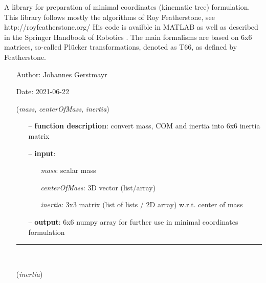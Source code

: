 \begin{itemize}[leftmargin=1.4cm]
\begin{itemize}[leftmargin=1.4cm]
\begin{itemize}[leftmargin=1.4cm]
\begin{itemize}[leftmargin=0.5cm]
\begin{itemize}[leftmargin=1.4cm]
\begin{itemize}[leftmargin=1.4cm]
\begin{itemize}[leftmargin=0.5cm]
\begin{itemize}[leftmargin=1.4cm]
\begin{itemize}[leftmargin=0.5cm]
\begin{itemize}[leftmargin=1.4cm]
\begin{itemize}[leftmargin=1.4cm]
%
\label{sec:module:kinematicTree}
  A library for preparation of minimal coordinates (kinematic tree) formulation.
           This library follows mostly the algorithms of Roy Featherstone, see http://royfeatherstone.org/
           His code is availble in MATLAB as well as described in the Springer Handbook of Robotics \cite{Siciliano2016}.
           The main formalisms are based on 6x6 matrices, so-called Pl\"ucker transformations, denoted as \ac{T66}, as defined by Featherstone.
\begin{itemize}[leftmargin=1.4cm]
\setlength{\itemindent}{-1.4cm}
\item[]Author:    Johannes Gerstmayr
\item[]Date:      2021-06-22
\ei
\begin{flushleft}
\label{sec:kinematicTree:MassCOMinertia2T66}
({\it mass}, {\it centerOfMass}, {\it inertia})
\end{flushleft}
\setlength{\itemindent}{0.7cm}
\begin{itemize}[leftmargin=0.7cm]
\item[--]
{\bf function description}: convert mass, COM and inertia into 6x6 inertia matrix
\item[--]
{\bf input}: \vspace{-6pt}
\begin{itemize}[leftmargin=1.2cm]
\setlength{\itemindent}{-0.7cm}
\item[]{\it mass}: scalar mass
\item[]{\it centerOfMass}: 3D vector (list/array)
\item[]{\it inertia}: 3x3 matrix (list of lists / 2D array) w.r.t. center of mass
\end{itemize}
\item[--]
{\bf output}: 6x6 numpy array for further use in minimal coordinates formulation
\vspace{12pt}\end{itemize}
%
\noindent\rule{8cm}{0.75pt}\vspace{1pt} \\ 
\begin{flushleft}
\label{sec:kinematicTree:Inertia2T66}
({\it inertia})
\end{flushleft}

\end{itemize}
\end{itemize}
\end{itemize}
\end{itemize}
\end{itemize}
\end{itemize}
\end{itemize}
\end{itemize}
\end{itemize}
\end{itemize}
\end{itemize}
\end{itemize}
